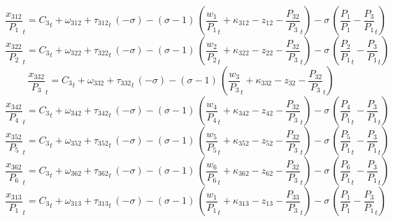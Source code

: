 \begin{dmath}
{{\frac{x_{312}}{P_{1}}}}_{t}={{C_{3}}}_{t}+{{\omega_{312}}}+{{\tau_{312}}}_{t}\, \left(-{{\sigma}}\right)-\left({{\sigma}}-1\right)\, \left({{\frac{w_{1}}{P_{1}}}}_{t}+{{\kappa_{312}}}-{{z_{12}}}-{{\frac{P_{32}}{P_{3}}}}_{t}\right)-{{\sigma}}\, \left({{\frac{P_{1}}{P_{1}}}}-{{\frac{P_{3}}{P_{1}}}}_{t}\right)
\end{dmath}
\begin{dmath}
{{\frac{x_{322}}{P_{2}}}}_{t}={{C_{3}}}_{t}+{{\omega_{322}}}+{{\tau_{322}}}_{t}\, \left(-{{\sigma}}\right)-\left({{\sigma}}-1\right)\, \left({{\frac{w_{2}}{P_{2}}}}_{t}+{{\kappa_{322}}}-{{z_{22}}}-{{\frac{P_{32}}{P_{3}}}}_{t}\right)-{{\sigma}}\, \left({{\frac{P_{2}}{P_{1}}}}_{t}-{{\frac{P_{3}}{P_{1}}}}_{t}\right)
\end{dmath}
\begin{dmath}
{{\frac{x_{332}}{P_{3}}}}_{t}={{C_{3}}}_{t}+{{\omega_{332}}}+{{\tau_{332}}}_{t}\, \left(-{{\sigma}}\right)-\left({{\sigma}}-1\right)\, \left({{\frac{w_{3}}{P_{3}}}}_{t}+{{\kappa_{332}}}-{{z_{32}}}-{{\frac{P_{32}}{P_{3}}}}_{t}\right)
\end{dmath}
\begin{dmath}
{{\frac{x_{342}}{P_{4}}}}_{t}={{C_{3}}}_{t}+{{\omega_{342}}}+{{\tau_{342}}}_{t}\, \left(-{{\sigma}}\right)-\left({{\sigma}}-1\right)\, \left({{\frac{w_{4}}{P_{4}}}}_{t}+{{\kappa_{342}}}-{{z_{42}}}-{{\frac{P_{32}}{P_{3}}}}_{t}\right)-{{\sigma}}\, \left({{\frac{P_{4}}{P_{1}}}}_{t}-{{\frac{P_{3}}{P_{1}}}}_{t}\right)
\end{dmath}
\begin{dmath}
{{\frac{x_{352}}{P_{5}}}}_{t}={{C_{3}}}_{t}+{{\omega_{352}}}+{{\tau_{352}}}_{t}\, \left(-{{\sigma}}\right)-\left({{\sigma}}-1\right)\, \left({{\frac{w_{5}}{P_{5}}}}_{t}+{{\kappa_{352}}}-{{z_{52}}}-{{\frac{P_{32}}{P_{3}}}}_{t}\right)-{{\sigma}}\, \left({{\frac{P_{5}}{P_{1}}}}_{t}-{{\frac{P_{3}}{P_{1}}}}_{t}\right)
\end{dmath}
\begin{dmath}
{{\frac{x_{362}}{P_{6}}}}_{t}={{C_{3}}}_{t}+{{\omega_{362}}}+{{\tau_{362}}}_{t}\, \left(-{{\sigma}}\right)-\left({{\sigma}}-1\right)\, \left({{\frac{w_{6}}{P_{6}}}}_{t}+{{\kappa_{362}}}-{{z_{62}}}-{{\frac{P_{32}}{P_{3}}}}_{t}\right)-{{\sigma}}\, \left({{\frac{P_{6}}{P_{1}}}}_{t}-{{\frac{P_{3}}{P_{1}}}}_{t}\right)
\end{dmath}
\begin{dmath}
{{\frac{x_{313}}{P_{1}}}}_{t}={{C_{3}}}_{t}+{{\omega_{313}}}+{{\tau_{313}}}_{t}\, \left(-{{\sigma}}\right)-\left({{\sigma}}-1\right)\, \left({{\frac{w_{1}}{P_{1}}}}_{t}+{{\kappa_{313}}}-{{z_{13}}}-{{\frac{P_{33}}{P_{3}}}}_{t}\right)-{{\sigma}}\, \left({{\frac{P_{1}}{P_{1}}}}-{{\frac{P_{3}}{P_{1}}}}_{t}\right)
\end{dmath}
